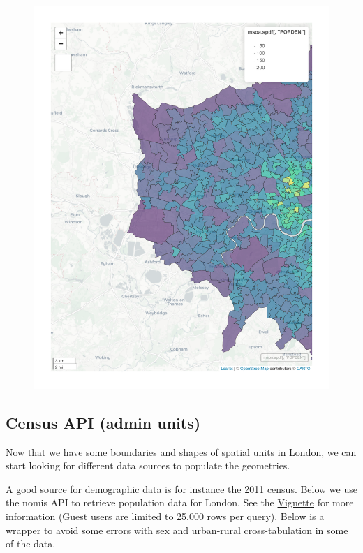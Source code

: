 \documentclass[
  letterpaper,
]{scrbook}
\begin{document}
\begin{figure}[H]

{\centering \includegraphics{01_refresher_files/figure-pdf/mapview-1.pdf}

}

\end{figure}

\hypertarget{census-api-admin-units}{%
\subsection{Census API (admin units)}\label{census-api-admin-units}}

Now that we have some boundaries and shapes of spatial units in London,
we can start looking for different data sources to populate the
geometries.

A good source for demographic data is for instance the 2011 census.
Below we use the nomis API to retrieve population data for London, See
the
\href{https://cran.r-project.org/web/packages/nomisr/vignettes/introduction.html}{Vignette}
for more information (Guest users are limited to 25,000 rows per query).
Below is a wrapper to avoid some errors with sex and urban-rural
cross-tabulation in some of the data.
\end{document}
